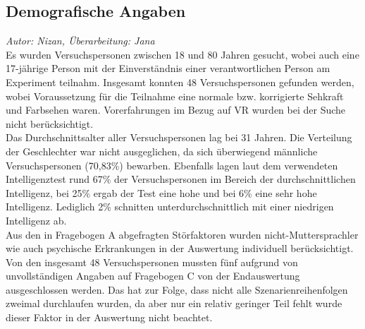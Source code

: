 \documentclass{Bericht}
\begin{document}
\subsection{Demografische Angaben}
\textit{Autor: Nizan, Überarbeitung: Jana}\\
Es wurden Versuchspersonen zwischen 18 und 80 Jahren gesucht, wobei auch eine 17-jährige Person mit der Einverständnis einer verantwortlichen Person am Experiment teilnahm. Insgesamt konnten 48 Versuchspersonen gefunden werden, wobei Voraussetzung für die Teilnahme eine normale bzw. korrigierte Sehkraft und Farbsehen waren. Vorerfahrungen im Bezug auf VR wurden bei der Suche nicht berücksichtigt.\\
Das Durchschnittsalter aller Versuchspersonen lag bei 31 Jahren.
Die Verteilung der Geschlechter war nicht ausgeglichen, da sich überwiegend männliche Versuchspersonen (70,83\%) bewarben. Ebenfalls lagen laut dem verwendeten Intelligenztest rund 67\% der Versuchspersonen im Bereich der durchschnittlichen Intelligenz, bei 25\% ergab der Test eine hohe und bei 6\% eine sehr hohe Intelligenz. Lediglich 2\% schnitten unterdurchschnittlich mit einer niedrigen Intelligenz ab.\\
Aus den in Fragebogen A abgefragten Störfaktoren wurden nicht-Muttersprachler wie auch psychische Erkrankungen in der Auswertung individuell berücksichtigt. 
Von den insgesamt 48 Versuchspersonen mussten fünf aufgrund von unvollständigen Angaben auf Fragebogen C von der Endauswertung ausgeschlossen werden. Das hat zur Folge, dass nicht alle Szenarienreihenfolgen zweimal durchlaufen wurden, da aber nur ein relativ geringer Teil fehlt wurde dieser Faktor in der Auswertung nicht beachtet.
\end{document}
